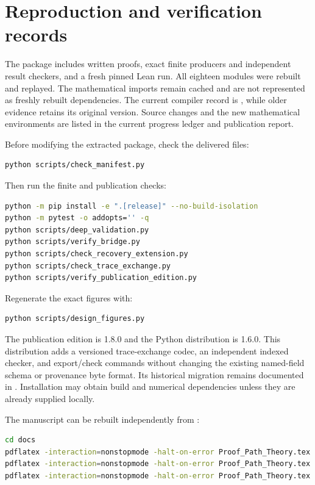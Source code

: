 \documentclass[11pt,oneside]{article}
\theoremstyle{komorebiplain}
\theoremstyle{komorebidefinition}
\theoremstyle{komorebiremark}
\begin{document}
\clearpage
\section{Reproduction and verification records}
\label{app:reproduction}

The package includes written proofs, exact finite producers and independent result checkers, and a fresh pinned Lean run. All eighteen modules were rebuilt and replayed. The mathematical imports remain cached and are not represented as freshly rebuilt dependencies. The current compiler record is , while older evidence retains its original version. Source changes and the new mathematical environments are listed in the current progress ledger and publication report.

Before modifying the extracted package, check the delivered files:
\begin{lstlisting}[language=bash]
python scripts/check_manifest.py
\end{lstlisting}
Then run the finite and publication checks:
\begin{lstlisting}[language=bash]
python -m pip install -e ".[release]" --no-build-isolation
python -m pytest -o addopts='' -q
python scripts/deep_validation.py
python scripts/verify_bridge.py
python scripts/check_recovery_extension.py
python scripts/check_trace_exchange.py
python scripts/verify_publication_edition.py
\end{lstlisting}

Regenerate the exact figures with:
\begin{lstlisting}[language=bash]
python scripts/design_figures.py
\end{lstlisting}
The publication edition is 1.8.0 and the Python distribution is 1.6.0. This distribution adds a versioned trace-exchange codec, an independent indexed checker, and export/check commands without changing the existing named-field schema or provenance byte format. Its historical migration remains documented in . Installation may obtain build and numerical dependencies unless they are already supplied locally.

The manuscript can be rebuilt independently from :
\begin{lstlisting}[language=bash]
cd docs
pdflatex -interaction=nonstopmode -halt-on-error Proof_Path_Theory.tex
pdflatex -interaction=nonstopmode -halt-on-error Proof_Path_Theory.tex
pdflatex -interaction=nonstopmode -halt-on-error Proof_Path_Theory.tex
\end{lstlisting}
\end{document}
